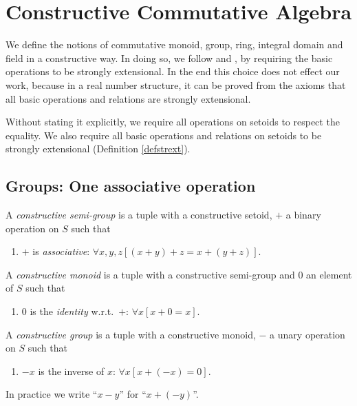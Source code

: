 
\section{Constructive Commutative Algebra}
We define the notions of commutative monoid, group, ring, integral
domain and field in a constructive way. In doing so, we follow
\cite{Ruit82} and \cite{TvD882}, by requiring the basic operations to
be strongly extensional. In the end this choice does not effect our
work, because in a real number structure, it can be proved from the
axioms that all basic operations and relations are strongly
extensional.

\begin{convention}\label{convstrext}
Without stating it explicitly, we require all operations on setoids to respect
the equality.
We also require all basic operations and relations on setoids to be
strongly extensional (Definition \ref{defstrext}).
\end{convention}

\subsection{Groups: One associative operation}
\begin{definition}\label{defsemigrp}
A {\em constructive semi-group\/} is a tuple  with
 a constructive setoid, $+$ a binary operation on
$S$ such that
  \begin{enumerate}
  \item $+$ is {\em associative}: $\forall x, y,z[(x+y)+z = x+(y+z)]$.
   \end{enumerate}
\end{definition}

\begin{definition}\label{defmonoid}
A {\em constructive monoid\/} is a tuple  with
 a constructive semi-group and $0$ an element of
$S$ such that
  \begin{enumerate}
  \item $0$ is the {\em identity\/} w.r.t.\ $+$: $\forall x[x+0=x]$.
  \end{enumerate}
\end{definition}

\begin{definition}\label{defgroup}
  A {\em constructive group\/} is a tuple 
  with  a constructive monoid, $-$ a unary
  operation on $S$ such that 
\begin{enumerate} 
\item $-x$ is the inverse of $x$: $\forall x[x+(-x)=0]$.
\end{enumerate}
In practice we write ``$x-y$'' for ``$x+(-y)$''.
\end{definition}


